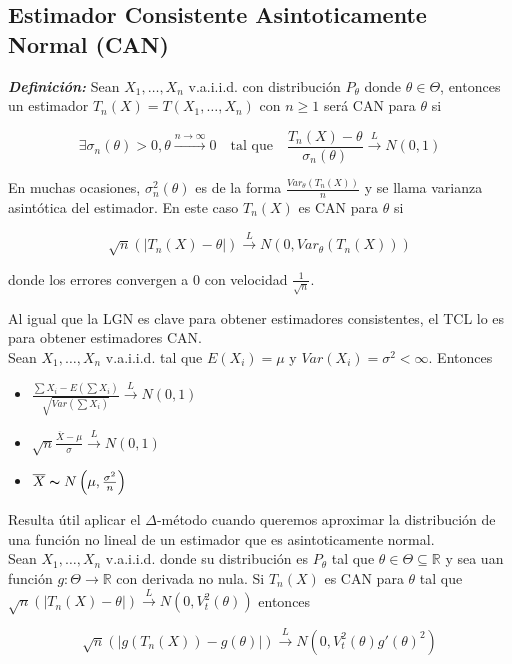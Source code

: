 \subsection{Estimador Consistente Asintoticamente Normal (CAN)}

\textbf{\textit{Definición: }} Sean $X_1,\dots,X_n$ v.a.i.i.d. con distribución $P_\theta$ donde $\theta \in \Theta$, entonces un estimador $T_n(X)=T(X_1,\dots,X_n)$ con $n\geq 1$ será CAN para $\theta$ si

\[
    \exists \sigma_n(\theta) > 0, \theta \xrightarrow{n\to\infty}0 \quad \text{tal que}\quad \frac{T_n(X)-\theta}{\sigma_n(\theta)}\overset{L}{\to}N(0,1)
\]

En muchas ocasiones, $\sigma^2_n(\theta)$ es de la forma $\frac{Var_\theta(T_n(X))}{n}$ y se llama varianza asintótica del estimador. En este caso $T_n(X)$ es CAN para $\theta$ si

\[
    \sqrt{n}(|T_n(X)-\theta|) \overset{L}{\to} N(0, Var_\theta(T_n(X)))
\]

donde los errores convergen a 0 con velocidad $\frac{1}{\sqrt{n}}$.

Al igual que la LGN es clave para obtener estimadores consistentes, el TCL lo es para obtener estimadores CAN. \\
Sean $X_1,\dots,X_n$ v.a.i.i.d. tal que $E(X_i)=\mu$ y $Var(X_i)=\sigma^2 < \infty$. Entonces

\begin{itemize}
    \item $\frac{\sum{X_i} - E(\sum{X_i})}{\sqrt{Var(\sum{X_i})}} \overset{L}{\to} N(0,1)$
    \item $\sqrt{n}\frac{\overline{X}-\mu}{\sigma}\overset{L}{\to}N(0,1)$
    \item $\overline{X}\thicksim N\left(\mu,\frac{\sigma^2}{n}\right)$
\end{itemize}

Resulta útil aplicar el $\Delta$-método cuando queremos aproximar la distribución de una función no lineal de un estimador que es asintoticamente normal.\\
Sean $X_1,\dots,X_n$ v.a.i.i.d. donde su distribución es $P_\theta$ tal que $\theta \in \Theta \subseteq \mathbb{R}$ y sea uan función $g:\Theta \to \mathbb{R}$ con derivada no nula. Si $T_n(X)$ es CAN para $\theta$ tal que $\sqrt{n}(|T_n(X)-\theta|)\overset{L}{\to}N(0,V^2_t(\theta))$ entonces

\[
    \sqrt{n}(|g(T_n(X))-g(\theta)|)\overset{L}{\to}N(0,V^2_t(\theta)g'(\theta)^2)
\]


